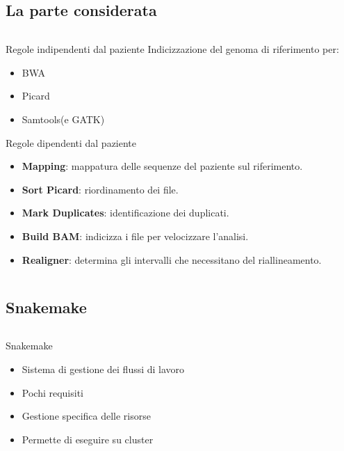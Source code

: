 \documentclass{beamer}
\begin{document}
\subsection{La parte considerata}
\begin{frame}
\begin{columns}
\begin{column}{0.8\linewidth}
\begin{block}{Regole indipendenti dal paziente}
Indicizzazione del genoma di riferimento per:
\begin{itemize}
\item BWA
\item Picard
\item Samtools(e GATK) 
\end{itemize}
\end{block}
\begin{block}{Regole dipendenti dal paziente}
\begin{itemize}
\item \textbf{Mapping}: mappatura delle sequenze del paziente sul riferimento.
\item \textbf{Sort Picard}: riordinamento dei file. 
\item \textbf{Mark Duplicates}: identificazione dei duplicati.
\item \textbf{Build BAM}: indicizza i file per velocizzare l'analisi.
\item \textbf{Realigner}: determina gli intervalli che necessitano del riallineamento.
\end{itemize}
\end{block}
\end{column}
\end{columns}
\end{frame}

\subsection{Snakemake}
\begin{frame}
\begin{columns}
\begin{column}{0.8\linewidth}
\begin{block}{Snakemake}
\begin{itemize}
\item Sistema di gestione dei flussi di lavoro
\item Pochi requisiti 
\item Gestione specifica delle risorse
\item Permette di eseguire su cluster
\end{itemize}
\end{block}
\end{column}
\end{columns}
\end{frame}
\end{document}
